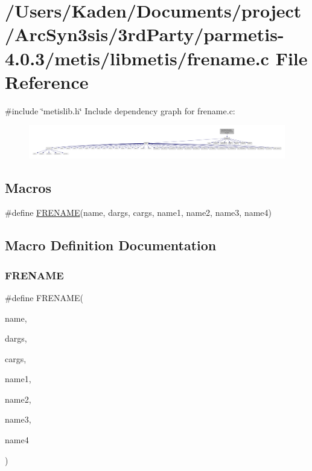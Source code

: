 \hypertarget{a00897}{}\section{/\+Users/\+Kaden/\+Documents/project/\+Arc\+Syn3sis/3rd\+Party/parmetis-\/4.0.3/metis/libmetis/frename.c File Reference}
\label{a00897}
{\ttfamily \#include \char`\"{}metislib.\+h\char`\"{}}\newline
Include dependency graph for frename.\+c\+:\nopagebreak
\begin{figure}[H]
\begin{center}
\leavevmode
\includegraphics[width=350pt]{a00898}
\end{center}
\end{figure}
\subsection*{Macros}
\begin{DoxyCompactItemize}
\item 
\#define \hyperlink{a00897_ad2b3d1be23c1431c79eea3bdac2a56fe}{F\+R\+E\+N\+A\+ME}(name,  dargs,  cargs,  name1,  name2,  name3,  name4)
\end{DoxyCompactItemize}


\subsection{Macro Definition Documentation}
\mbox{\label{a00897_ad2b3d1be23c1431c79eea3bdac2a56fe}} 
\subsubsection{\texorpdfstring{F\+R\+E\+N\+A\+ME}{FRENAME}}
{\footnotesize\ttfamily \#define F\+R\+E\+N\+A\+ME(\begin{DoxyParamCaption}\item[{}]{name,  }\item[{}]{dargs,  }\item[{}]{cargs,  }\item[{}]{name1,  }\item[{}]{name2,  }\item[{}]{name3,  }\item[{}]{name4 }\end{DoxyParamCaption})}

